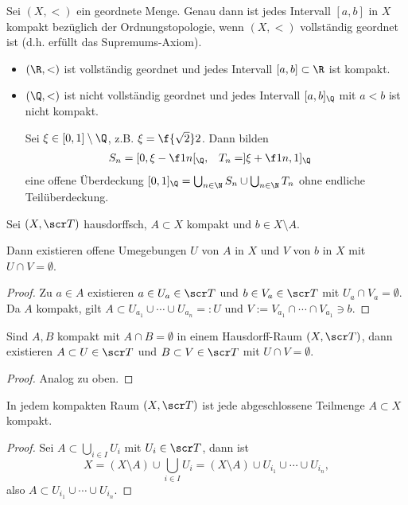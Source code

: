 \begin{st}
	Sei $(X, <)$ ein geordnete Menge.
	Genau dann ist jedes Intervall $[a,b]$ in $X$ kompakt bezüglich der Ordnungstopologie, wenn $(X, <)$ vollständig geordnet ist (d.h. erfüllt das Supremums-Axiom).
\end{st}

\begin{ex}
	\begin{itemize}
		\item
			$(\R, <)$ ist vollständig geordnet und jedes Intervall $[a,b] \subset \R$ ist kompakt.
		\item
			$(\Q, <)$ ist nicht vollständig geordnet und jedes Intervall $[a,b]_\Q$ mit $a<b$ ist nicht kompakt.

			Sei $\xi \in [0,1] \setminus \Q$, z.B. $\xi = \f{\sqrt 2}2$.
			Dann bilden
			\begin{align*}
				S_n &= [0, \xi - \f 1n[_{\Q},&
				T_n &= ]\xi + \f 1n, 1]_{\Q}
			\end{align*}
			eine offene Überdeckung $[0,1]_{\Q} = \bigcup_{n\in\N} S_n \cup \bigcup_{n\in\N} T_n$ ohne endliche Teilüberdeckung.
	\end{itemize}
\end{ex}

\begin{lem}
	Sei $(X, \scr T)$ hausdorffsch, $A \subset X$ kompakt und $b \in X \setminus A$.

	Dann existieren offene Umegebungen $U$ von $A$ in $X$ und $V$ von $b$ in $X$ mit $U\cap V = \emptyset$.
	\begin{proof}
		Zu $a \in A$ existieren $a \in U_a \in \scr T$ und $b \in V_a \in \scr T$ mit $U_a \cap V_a = \emptyset$.
		Da $A$ kompakt, gilt $A \subset U_{a_1} \cup \dotsb \cup U_{a_n} =: U$ und $V := V_{a_1} \cap \dotsb \cap V_{a_1} \ni b$.
	\end{proof}
\end{lem}

\begin{st}
	Sind $A, B$ kompakt mit $A \cap B = \emptyset$ in einem Hausdorff-Raum $(X, \scr T)$, dann existieren $A \subset U \in \scr T$ und $B \subset V \in \scr T$ mit $U \cap V = \emptyset$.
	\begin{proof}
		Analog zu oben.
	\end{proof}
\end{st}


\begin{st}
	In jedem kompakten Raum $(X, \scr T)$ ist jede abgeschlossene Teilmenge $A \subset X$ kompakt.
	\begin{proof}
		Sei $A \subset \bigcup_{i\in I} U_i$ mit $U_i \in \scr T$, dann ist
		\[
			X
			= (X \setminus A) \cup \bigcup_{i\in I} U_i
			= (X \setminus A) \cup U_{i_1} \cup \dotsb \cup U_{i_n},
		\]
		also $A \subset U_{i_1} \cup \dotsb \cup U_{i_n}$.
	\end{proof}
\end{st}

